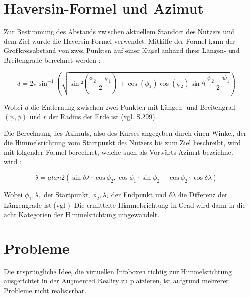 \section{Haversin-Formel und Azimut}

Zur Bestimmung des Abstands zwischen aktuellem Standort des Nutzers und dem Ziel wurde die Haversin Formel verwendet. Mithilfe der Formel kann der Großkreisabstand von zwei Punkten auf einer Kugel anhand ihrer Längen- und Breitengrade berechnet werden \cite{haversine}: 

\begin{equation}
d = 2 \pi \sin^{-1} (\sqrt{\sin²(\frac{\phi_2 - \phi_1}{2})+\cos(\phi_1)\cos(\phi_2)\sin²(\frac{\psi_2-\psi_1}{2}})
\end{equation}

Wobei $d$ die Entfernung zwischen zwei Punkten mit Längen- und Breitengrad $(\psi,\phi)$ und $r$ der Radius der Erde ist (vgl. \cite{haversine} S.299).

Die Berechnung des Azimuts, also des Kurses angegeben durch einen Winkel, der die Himmelsrichtung vom Startpunkt des Nutzers bis zum Ziel beschreibt, wird mit folgender Formel berechnet, welche auch als \glqq Vorwärts-Azimut\grqq{} bezeichnet wird \cite{bearing}:

\begin{equation}
\theta = atan2(\sin \delta\lambda \cdot\cos\phi_2, \cos \phi_1 \cdot\sin\phi_2 - \cos\phi_2 \cdot\cos\delta\lambda)
\end{equation}

Wobei $\phi_1,\lambda_1$ der Startpunkt, $\phi_2,\lambda_2$ der Endpunkt und $\delta\lambda$   die Differenz der Längengrade ist (vgl \cite{bearing}). Die ermittelte Himmelsrichtung in Grad wird dann in die acht Kategorien der Himmelsrichtung umgewandelt.

\section{Probleme}

Die ursprüngliche Idee, die virtuellen Infoboxen richtig zur Himmelsrichtung ausgerichtet in der Augmented Reality zu platzieren, ist aufgrund mehrerer Probleme nicht realisierbar.

